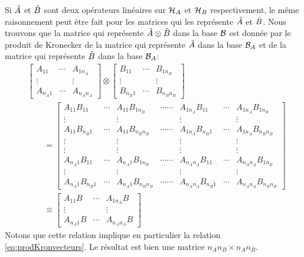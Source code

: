 \documentclass[11pt,a4paper,oneside]{article}
\begin{document}
Si $\hat{A}$ et $\hat{B}$ sont deux opérateurs linéaires sur $\mathcal{H}_A$ et $\mathcal{H}_B$ respectivement, le même raisonnement peut être fait pour les matrices qui les représente $\hat{A}$ et $\hat{B}$. Nous trouvons que la matrice qui représente $\hat{A}\otimes\hat{B}$ dans la base $\mathcal{B}$ est donnée par le produit de Kronecker de la matrice qui représente $\hat{A}$ dans la base $\mathcal{B}_A$ et de la matrice qui représente $\hat{B}$ dans la base $\mathcal{B}_A$:
\begin{align}
    &\begin{bmatrix}
        A_{11} & \cdots & A_{1n_A}\\
        \vdots & & \vdots\\
        A_{n_A1} & \cdots & A_{n_An_A}
    \end{bmatrix}\otimes
    \begin{bmatrix}
        B_{11} & \cdots & B_{1n_B}\\
        \vdots & & \vdots\\
        B_{n_B1} & \cdots & B_{n_Bn_B}
    \end{bmatrix}\\
    &\qquad=
    \begin{bmatrix}
        A_{11}B_{11} & \cdots & A_{11}B_{1n_B} & \cdots\cdots & A_{1n_A}B_{11} & \cdots & A_{1n_A}B_{1n_B}\\
        \vdots & & \vdots & & \vdots & & \vdots \\
        A_{11}B_{n_B1} & \cdots & A_{11}B_{n_Bn_B} & \cdots\cdots & A_{1n_A}B_{n_B1} & \cdots & A_{1n_A}B_{n_Bn_B} \\
        \vdots & & \vdots & & \vdots & & \vdots \\
        \vdots & & \vdots & & \vdots & & \vdots \\
        A_{n_A1}B_{11} & \cdots & A_{n_A1}B_{1n_B} & \cdots\cdots & A_{n_An_A}B_{11} & \cdots & A_{n_An_A}B_{1n_B}\\
        \vdots & & \vdots & & \vdots & & \vdots \\
        A_{n_A1}B_{n_B1} & \cdots & A_{n_A1}B_{n_Bn_B} & \cdots\cdots & A_{n_An_A}B_{n_B1} & \cdots & A_{n_An_A}B_{n_Bn_B}
    \end{bmatrix}\\
    &\qquad\equiv
    \begin{bmatrix}
        A_{11}B & \cdots & A_{1n_A}B\\
        \vdots & & \vdots\\
        A_{n_A1}B & \cdots & A_{n_An_A}B
    \end{bmatrix}
\end{align}
Notons que cette relation implique en particulier la relation \eqref{eq:prodKronvecteurs}. Le résultat est bien une matrice $n_An_B\times n_An_B$.
\end{document}

